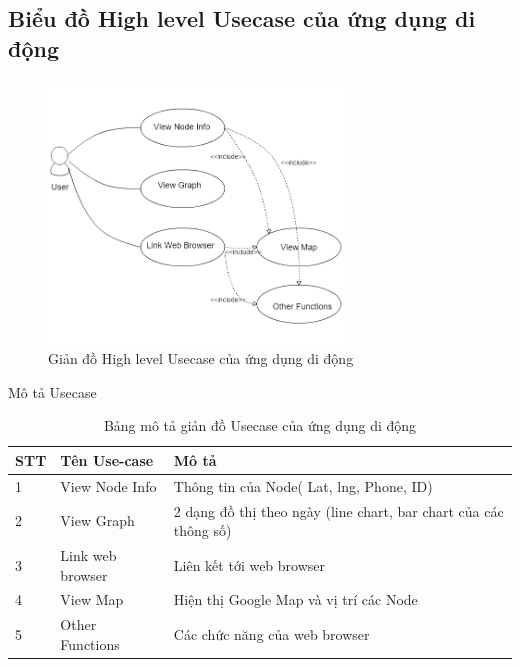 




\subsection*{Biểu đồ High level Usecase của ứng dụng di động}

\begin{figure}[H]
\centering    
\includegraphics[width=0.7\textwidth]{app_usecase}
\caption[Giản đồ High level Usecase của ứng dụng di động]{Giản đồ High level Usecase của ứng dụng di động}
\label{fig:app_usecase}
\end{figure}

Mô tả Usecase

\begin{table}[H]
\centering
\caption{Bảng mô tả giản đồ Usecase của ứng dụng di động}
\label{table:usecase_mobile}
\begin{tabular}{|l|l|l|}
\hline
STT & Tên Use-case     & Mô tả                                                            \\ \hline
1   & View Node Info   & Thông tin của Node( Lat, lng, Phone, ID)                         \\ \hline
2   & View Graph       & 2 dạng đồ thị theo ngày (line chart, bar chart của các thông số) \\ \hline
3   & Link web browser & Liên kết tới web browser                                         \\ \hline
4   & View Map         & Hiện thị Google Map và vị trí các Node                           \\ \hline
5   & Other Functions  & Các chức năng của web browser                                    \\ \hline
\end{tabular}
\end{table}







